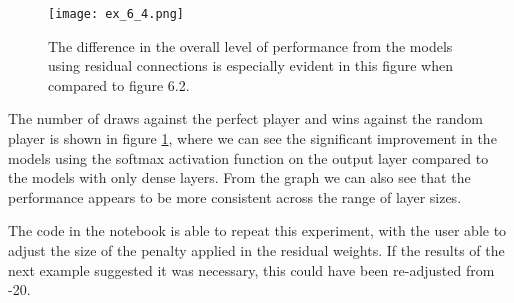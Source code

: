 \documentclass{somasmsc}
\begin{document}
\begin{exa}
\begin{figure}[H]\label{ox:ex_6_4}
\begin{center}
\texttt{[image: ex\_6\_4.png]}
\end{center}
\caption{The difference in the overall level of performance from the models using residual connections is especially evident in this figure when compared to figure 6.2.}
\end{figure}

The number of draws against the perfect player and wins against the random player is shown in figure \ref{ox:ex_6_4}, where we can see the significant improvement in the models using the softmax activation function on the output layer compared to the models with only dense layers. From the graph we can also see that the performance appears to be more consistent across the range of layer sizes.

The code in the notebook is able to repeat this experiment, with the user able to adjust the size of the penalty applied in the residual weights. If the results of the next example suggested it was necessary, this could have been re-adjusted from -20.
\end{exa}
\end{document}
